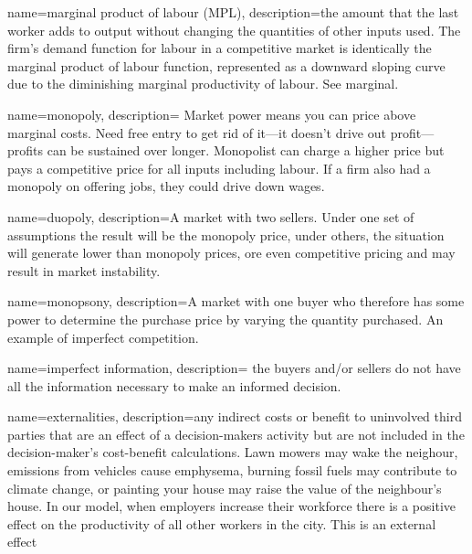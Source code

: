 
{
name=marginal product of labour (MPL),
description={the amount that the last worker  adds to output without changing the quantities of other inputs used. The firm's \gls{demand function} for labour in a competitive market is identically  the \gls{marginal product} of labour function, represented as a downward sloping curve due to the diminishing marginal productivity of labour. See \gls{marginal}.}
}

{
name=monopoly,
description={ Market power means you can price above marginal costs. Need free entry to get rid of it---it doesn't drive out profit---profits can be sustained over longer. Monopolist can charge a higher price but pays a competitive price for all \glspl{input} including labour. If a firm also had a monopoly on offering jobs, they could drive down wages.}
}

{
name=duopoly,
description={A market with two sellers. Under one set of assumptions the result will be the monopoly price, under others, the situation will generate lower  than monopoly prices, ore even competitive pricing and may result in market instability.}
}

{
name=monopsony,
description={A market with one buyer who therefore has some power to determine the purchase price by varying the quantity purchased. An example of \gls{imperfect competition}.}
}

{
name=imperfect information,
description={ the buyers and/or sellers do not have all the information necessary to make an informed decision.}
}

{
name=externalities,
description={any indirect costs or benefit to uninvolved third parties that are an effect of a decision-makers activity but are not included in the decision-maker's cost-benefit calculations. Lawn mowers may wake the neighour, emissions from vehicles cause emphysema, burning fossil fuels may contribute to climate change, or painting your house may raise the value of the neighbour's house. In our model, when employers increase their workforce there is a positive effect on the productivity of all other workers in the city. This is an external effect}
}


